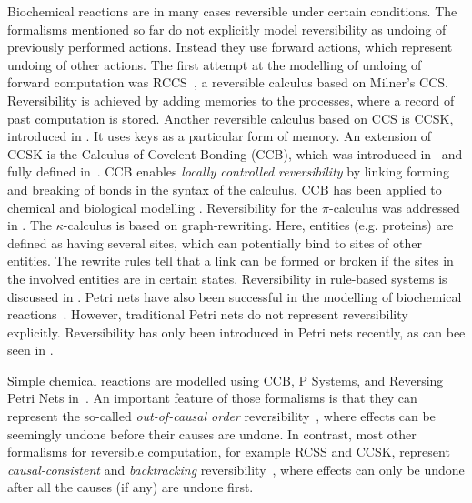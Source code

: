 Biochemical reactions are in many cases reversible under certain conditions. The formalisms mentioned so far do not explicitly model reversibility as undoing of previously performed actions. Instead they use forward actions, which represent undoing of other actions.
The first attempt at the modelling of undoing of forward computation was RCCS~\cite{10.1007/978-3-540-28644-8_19}, a reversible calculus based on Milner's CCS. Reversibility is achieved by adding memories to the processes, where a record of past computation is stored. Another reversible calculus based on CCS is CCSK, introduced in \cite{PU06,PHILLIPS200770}. It uses keys as a particular form of memory. An extension of CCSK is the Calculus of Covelent Bonding (CCB), which was introduced in~\cite{KU16} and fully defined in~\cite{KU2017}. CCB enables \textit{locally controlled reversibility} by linking forming and breaking of bonds in the syntax of the calculus. CCB has been applied to chemical and biological modelling \cite{10.1007/978-3-319-99498-7_8, Kuhn2020ReversibilityIC}. Reversibility for the $\pi$-calculus was addressed in \cite{10.1007/978-3-642-15375-4_33}. The $\kappa$-calculus \cite{DANOS200469} is based on graph-rewriting. Here, entities (e.g. proteins) are defined as having several sites, which can potentially bind to sites of other entities. The rewrite rules tell that a link can be formed or broken if the sites in the involved entities are in certain states. Reversibility in rule-based systems is discussed in \cite{Aman2020}. 
Petri nets have also been successful in the modelling of biochemical reactions~\cite{10.1007/978-3-540-68894-5_7}. However, traditional Petri nets do not represent reversibility explicitly. Reversibility has only been introduced in Petri nets recently, as can bee seen in \cite{DBLP:conf/rc/PhilippouP18,DBLP:conf/apn/BarylskaGMPPP18,MelgrattiMU20,MelgrattiMPPU20,DBLP:journals/corr/abs-2010-04000}. 


Simple chemical reactions are modelled using CCB, P Systems, and Reversing Petri Nets in~\cite{Kuhn2020ReversibilityIC}. 
An important feature of those formalisms is that they can represent the so-called \emph{out-of-causal order} reversibility~\cite{Irek2012}, where effects can be seemingly undone before their causes are undone.
In contrast, most other formalisms for reversible computation, for example RCSS and CCSK, represent \emph{causal-consistent} and \emph{backtracking} reversibility~\cite{DK2007,LPU2020}, where effects can only be undone after all the causes (if any) are undone first.
